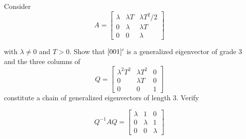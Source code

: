 \item[3.17] Consider
\begin{equation*}
 A = \begin{bmatrix}
      \lambda & \lambda T & \lambda T^2 / 2 \\
      0 &\lambda & \lambda T \\
      0 & 0 & \lambda
     \end{bmatrix}
\end{equation*}

with $\lambda \neq 0$ and $T > 0$.
Show that $[0 \/ 0 \/ 1]'$ is a generalized eigenvector of grade 3 and the three columns of
\begin{equation*}
 Q = \begin{bmatrix}
      \lambda^2 T^2 & \lambda T^2 & 0\\
      0 & \lambda T & 0\\
      0 & 0 & 1
     \end{bmatrix}
\end{equation*}
 constitute a chain of generalized eigenvectors of length 3.
 Verify

 \begin{equation*}
  Q^{-1} A Q = \begin{bmatrix}
                \lambda & 1 & 0\\
                0 & \lambda & 1\\
                0 & 0 & \lambda
               \end{bmatrix}
 \end{equation*}
